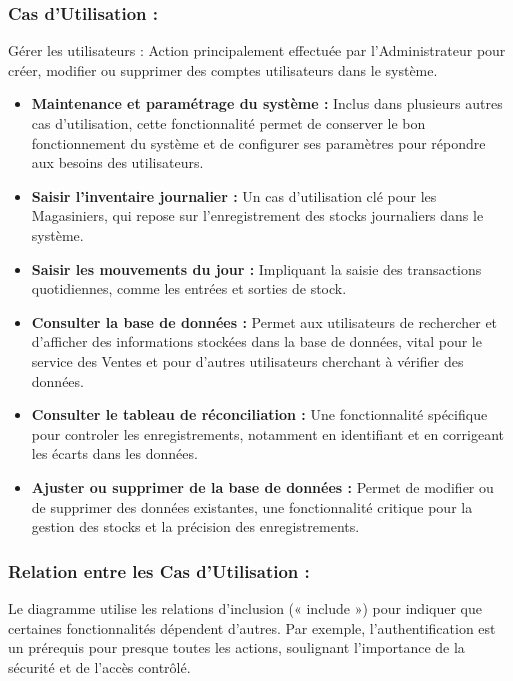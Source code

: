 \documentclass[a4paper, oneside, 12pt, final]{extreport}
\begin{document}
\subsubsection{Cas d'Utilisation :}
Gérer les utilisateurs : Action principalement effectuée par l'Administrateur pour créer, modifier ou supprimer des comptes utilisateurs dans le système.
\begin{itemize}
\item \textbf{Maintenance et paramétrage du système :} Inclus dans plusieurs autres cas d'utilisation, cette fonctionnalité permet de conserver le bon fonctionnement du système et de configurer ses paramètres pour répondre aux besoins des utilisateurs.
\item \textbf{Saisir l'inventaire journalier :} Un cas d'utilisation clé pour les Magasiniers, qui repose sur l’enregistrement des stocks journaliers dans le système.
\item \textbf{Saisir les mouvements du jour :} Impliquant la saisie des transactions quotidiennes, comme les entrées et sorties de stock.
\item \textbf{Consulter la base de données : }Permet aux utilisateurs de rechercher et d'afficher des informations stockées dans la base de données, vital pour le service des Ventes et pour d'autres utilisateurs cherchant à vérifier des données.
\item \textbf{Consulter le tableau de réconciliation :} Une fonctionnalité spécifique pour controler les enregistrements, notamment en identifiant et en corrigeant les écarts dans les données.
\item \textbf{Ajuster ou supprimer de la base de données :} Permet de modifier ou de supprimer des données existantes, une fonctionnalité critique pour la gestion des stocks et la précision des enregistrements.
\end{itemize}
\subsubsection{Relation entre les Cas d'Utilisation :}
Le diagramme utilise les relations d'inclusion (« include ») pour indiquer que certaines fonctionnalités dépendent d'autres. Par exemple, l'authentification est un prérequis pour presque toutes les actions, soulignant l'importance de la sécurité et de l'accès contrôlé.
\end{document}
